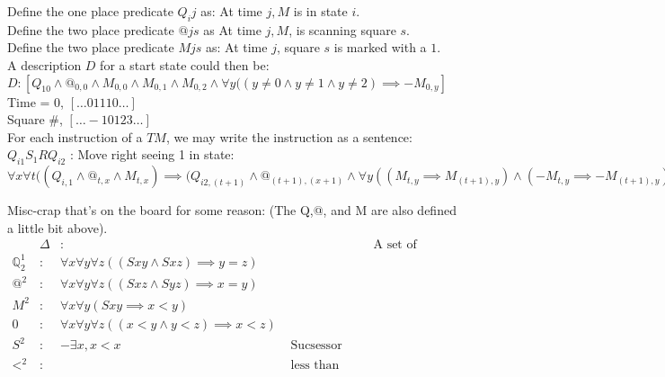 Define the one place predicate $Q_ij$ as: At time $j, M$ is in state $i$. \\
Define the two place predicate $@js$ as At time $j, M$, is scanning square $s$. \\
Define the two place predicate $Mjs$ as: At time $j$, square $s$ is marked with a $1$. \\

A description $D$ for a start state could then be: \\
$D: [Q_10 \wedge @_{0,0} \wedge M_{0,0} \wedge M_{0,1} \wedge M_{0,2} \wedge \forall y((y \not = 0 \wedge y \not = 1 \wedge y \not = 2 ) \implies - M_{0,y}]$ \\
Time = 0, $[ \dots 0 1 1 1 0 \dots ]$ \\
Square \#, $[\dots -1 0 1 2 3 \dots ]$ \\


For each instruction of a $TM$, we may write the instruction as a sentence: \\
$Q_{i1}S_1RQ_{i2}$ : 
Move right seeing 1 in state: \\
$\forall x \forall t ((Q_{i,1} \wedge @_{t,x} \wedge M_{t,x}) \implies (Q_{i2,(t+1)} \wedge @_{(t+1),(x+1)} \wedge \forall y((M_{t,y} \implies M_{(t+1),y}) \wedge (- M_{t,y} \implies - M_{(t+1),y}))$

Misc-crap that's on the board for some reason: (The Q,@, and M are also defined a little bit above).\\
\begin{align*}
 & \Delta &:&& \text{ A set of sentences.}\\
\mathbb{Q}^1_2  &:& \forall x \forall y \forall z ((Sxy \wedge Sxz) \implies y = z)       & \text{}\\
@^2            &:& \forall x \forall y \forall z ((Sxz \wedge Syz) \implies x = y )       & \text{}\\
M^2             &:& \forall x \forall y ( Sxy \implies x < y )                            & \text{}\\
0               &:& \forall x \forall y \forall z ((x < y \wedge y < z ) \implies x < z ) & \text{}\\
S^2             &:& - \exists x , x < x                                                   & \text{ Sucsessor (+1)}\\
<^2             &:& & \text{ less than} 
\end{align*}


